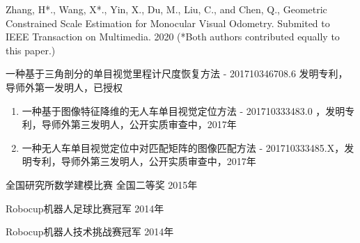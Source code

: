 \begin{enumerate}[{[}1{]}]
  \item Zhang, H*.,  Wang, X*., Yin, X., Du, M., Liu, C., and Chen, Q., Geometric Constrained Scale Estimation for Monocular Visual Odometry.
  Submited to IEEE Transaction on Multimedia. 2020 (*Both authors contributed equally to this paper.)
\end{enumerate}
\begin{enumerate}[{[}1{]}]
\item 一种基于三角剖分的单目视觉里程计尺度恢复方法 - 201710346708.6 发明专利，导师外第一发明人，已授权 
\end{enumerate}
\begin{enumerate}
  \item 一种基于图像特征降维的无人车单目视觉定位方法 - 201710333483.0 ，发明专利，导师外第三发明人，公开实质审查中，2017年
  \item 一种无人车单目视觉定位中对匹配矩阵的图像匹配方法 - 201710333485.X，发明专利，导师外第三发明人，公开实质审查中，2017年
\end{enumerate}

\begin{enumerate}[{[}1{]}]
\item 全国研究所数学建模比赛 全国二等奖 2015年 
\item Robocup机器人足球比赛冠军  2014年
\item Robocup机器人技术挑战赛冠军 2014年
\end{enumerate}

